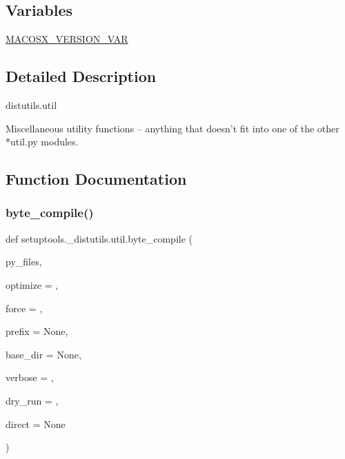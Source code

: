 \subsection*{Variables}
\begin{DoxyCompactItemize}
\item 
\hyperlink{namespacesetuptools_1_1__distutils_1_1util_aaa397facc6d0331cc9c4b252adc5c3c4}{M\+A\+C\+O\+S\+X\+\_\+\+V\+E\+R\+S\+I\+O\+N\+\_\+\+V\+AR}
\end{DoxyCompactItemize}


\subsection{Detailed Description}
\begin{DoxyVerb}distutils.util

Miscellaneous utility functions -- anything that doesn't fit into
one of the other *util.py modules.
\end{DoxyVerb}
 

\subsection{Function Documentation}
\mbox{\label{namespacesetuptools_1_1__distutils_1_1util_ae71f0c8c828e94dd4644bf5339c75f66}} 
\subsubsection{\texorpdfstring{byte\+\_\+compile()}{byte\_compile()}}
{\footnotesize\ttfamily def setuptools.\+\_\+distutils.\+util.\+byte\+\_\+compile (\begin{DoxyParamCaption}\item[{}]{py\+\_\+files,  }\item[{}]{optimize = {},  }\item[{}]{force = {},  }\item[{}]{prefix = {\ttfamily None},  }\item[{}]{base\+\_\+dir = {\ttfamily None},  }\item[{}]{verbose = {},  }\item[{}]{dry\+\_\+run = {},  }\item[{}]{direct = {\ttfamily None} }\end{DoxyParamCaption})}

